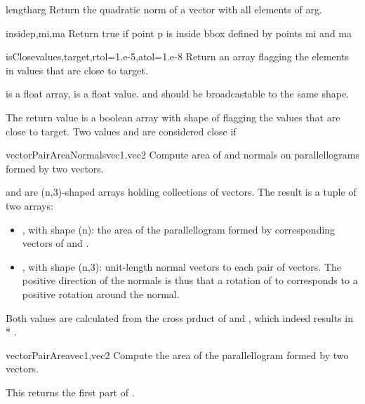 \begin{funcdesc}{length}{arg}
    Return the quadratic norm of a vector with all elements of arg.
\end{funcdesc}

\begin{funcdesc}{inside}{p,mi,ma}
    Return true if point p is inside bbox defined by points mi and ma
\end{funcdesc}


\begin{funcdesc}{isClose}{values,target,rtol=1.e-5,atol=1.e-8}
Return an array flagging the elements in values that are close to target.

 is a float array,  is a float value.
 and  should be broadcastable to the same shape.
    
The return value is a boolean array with shape of  flagging
the values that are close to target.
Two values  and   are considered close if 
\end{funcdesc}

\begin{funcdesc}{vectorPairAreaNormals}{vec1,vec2}
Compute area of and normals on parallellograms formed by two vectors.

 and  are (n,3)-shaped arrays holding collections of vectors. 
The result is a tuple of two arrays:
\begin{itemize}
\item {}, with shape (n): the area of the parallellogram formed by corresponding vectors of  and .
\item {}, with shape (n,3): unit-length normal vectors to each pair of vectors. The positive direction of the normals is thus that a rotation of  to  corresponds to a positive rotation around the normal.
\end{itemize}
Both values are calculated from the cross prduct of  and , which indeed results in  * .
\end{funcdesc}

\begin{funcdesc}{vectorPairArea}{vec1,vec2}
Compute the area of the parallellogram formed by two vectors.

This returns the first part of .
\end{funcdesc}

